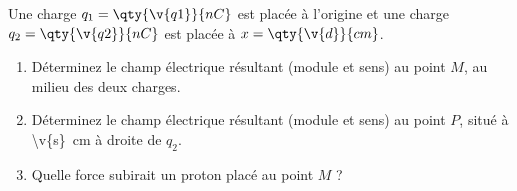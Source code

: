 Une charge $q_1 = \qty{\v{q1}}{nC}$ est placée à l'origine et une charge $q_2 = \qty{\v{q2}}{nC}$ est placée à $x = \qty{\v{d}}{cm}$.

\begin{center}
\end{center}

\begin{enumerate}[label=\alph*)]
    \item Déterminez le champ électrique résultant (module et sens) au point $M$, au milieu des deux charges.
    \item Déterminez le champ électrique résultant (module et sens) au point $P$, situé à \qty{\v{s}}{cm} à droite de $q_2$.
    \item Quelle force subirait un proton placé au point $M$ ?
\end{enumerate}
